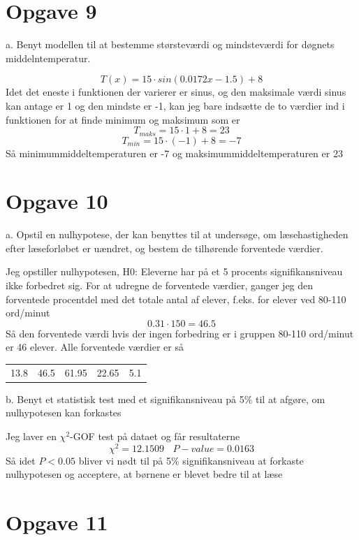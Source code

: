 \documentclass[12pt]{article}
\begin{document}
\section*{Opgave 9}

a. Benyt modellen til at bestemme størsteværdi og mindsteværdi for døgnets middelntemperatur.

$$T(x) = 15\cdot sin(0.0172x-1.5)+8$$
Idet det eneste i funktionen der varierer er sinus, og den maksimale værdi sinus kan antage er 1 og den mindste er -1, kan jeg bare
indsætte de to værdier ind i funktionen for at finde minimum og maksimum som er
$$T_{maks} = 15\cdot 1+8 = 23$$
$$T_{min} = 15\cdot (-1)+8 = -7$$
Så minimummiddeltemperaturen er -7 og maksimummiddeltemperaturen er 23

\section*{Opgave 10}

a. Opstil en nulhypotese, der kan benyttes til at undersøge, om læsehastigheden efter læseforløbet er uændret, og bestem de tilhørende forventede værdier.

Jeg opstiller nulhypotesen, H0: Eleverne har på et 5 procents signifikansniveau ikke forbedret sig. For at udregne de forventede værdier, ganger
jeg den forventede procentdel med det totale antal af elever, f.eks. for elever ved 80-110 ord/minut
$$0.31\cdot 150 = 46.5$$
Så den forventede værdi hvis der ingen forbedring er i gruppen 80-110 ord/minut er 46 elever. Alle forventede værdier er så
\begin{center}
\begin{tabular}{c c c c c}
        13.8 & 46.5 & 61.95 & 22.65 & 5.1 \\
\end{tabular}
\end{center}

b. Benyt et statistisk test med et signifikansniveau på 5\% til at afgøre, om nulhypotesen kan forkastes

Jeg laver en $\chi ^2$-GOF test på dataet og får resultaterne
$$\chi ^2 = 12.1509 ~~~~ P-value = 0.0163$$
Så idet $P<0.05$ bliver vi nødt til på 5\% signifikansniveau at forkaste nulhypotesen og acceptere, at børnene er blevet bedre til at læse

\section*{Opgave 11}
\end{document}
